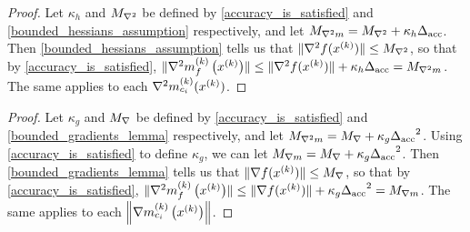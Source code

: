 
\begin{proof}
Let $\kappa_h$ and ${M_{\nabla^2}}$ be defined by \cref{accuracy_is_satisfied} and \cref{bounded_hessians_assumption} respectively,
and let ${M_{\nabla^2 m}} = {M_{\nabla^2}} + \kappa_h {\Delta_{\textrm{acc}}}$.
Then \cref{bounded_hessians_assumption} tells us that
$\|\nabla^2 f(x^{(k)})\| \le {M_{\nabla^2}}$, so that by \cref{accuracy_is_satisfied},
$\|{\nabla^2m_f^{(k)}\left(x^{(k)}\right)}\| \le \|\nabla^2 f(x^{(k)})\| + \kappa_h{\Delta_{\textrm{acc}}} = {M_{\nabla^2 m}}$.
The same applies to each $\nabla^2 m_{c_i}^{(k)}(x^{(k)})$.
\end{proof}

\begin{proof}
Let $\kappa_g$ and ${M_{\nabla}}$ be defined by \cref{accuracy_is_satisfied} and \cref{bounded_gradients_lemma} respectively,
and let ${M_{\nabla^2 m}} = {M_{\nabla}} + \kappa_g {\Delta_{\textrm{acc}}}^2$.
Using \cref{accuracy_is_satisfied} to define $\kappa_g$, we can let ${M_{\nabla m}} = {M_{\nabla}} + \kappa_g {\Delta_{\textrm{acc}}}^2$.
Then \cref{bounded_gradients_lemma} tells us that
$\|\nabla f(x^{(k)})\| \le {M_{\nabla}}$, so that by \cref{accuracy_is_satisfied},
$\|{\nabla^2m_f^{(k)}\left(x^{(k)}\right)}\| \le \|\nabla f(x^{(k)})\| + \kappa_g{\Delta_{\textrm{acc}}}^2 = {M_{\nabla m}}$.
The same applies to each $\left\|{\nabla m_{c_i}^{(k)}\left(x^{(k)}\right)}\right\|$.
\end{proof}

